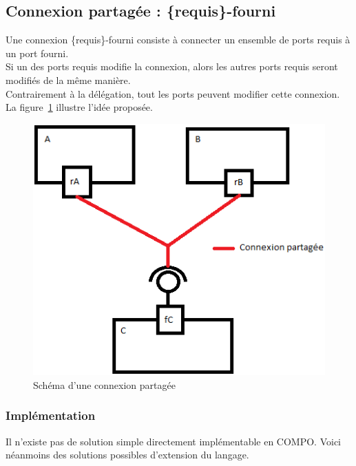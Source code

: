 \documentclass[11pt,a4paper,openany,oneside]{book}
\begin{document}
\subsection{Connexion partagée : \{requis\}-fourni}
\label{connexionPartageeRef}
Une connexion \{requis\}-fourni consiste à connecter un ensemble de ports requis à un port fourni.\\ 
Si un des ports requis modifie la connexion, alors les autres ports requis seront modifiés de la même manière.\\
Contrairement à la délégation, tout les ports peuvent modifier cette connexion. La figure~\ref{connexionPartagee} illustre l'idée proposée.
\begin{figure}[H]
\centering
\includegraphics[scale=0.7, keepaspectratio=true]{connexionPartagee.png}
\caption{Schéma d'une connexion partagée}
\label{connexionPartagee}
\end{figure}

\subsubsection{Implémentation}
Il n'existe pas de solution simple directement implémentable en COMPO. Voici néanmoins des solutions possibles d'extension du langage.
\end{document}
